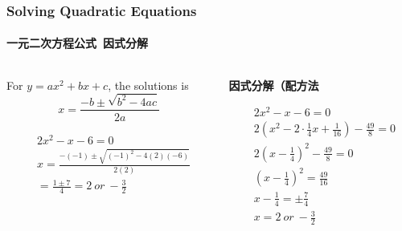 \documentclass[
	11pt, %
]{beamer}
\begin{document}
\begin{frame}
	\frametitle{Solving Quadratic Equations}
	\framesubtitle{一元二次方程公式\ 因式分解}

	\begin{columns}[t] 
		\begin{column}{0.5\textwidth} %
				\begin{theorem}[一元二次方程公式]
					For $y = ax^2 + bx + c$, the solutions is \\
					\begin{equation*}
						x=\frac{-b \pm \sqrt{b^2 - 4ac}}{2a}
					\end{equation*}
				\end{theorem}

				\begin{example}
					\begin{equation*}
						\begin{aligned}
							&2x^2 -x - 6 = 0 \\
							&x = \frac{-(-1) \pm \sqrt{(-1)^2 - 4(2)(-6)}}{2(2)} \\
							&= \frac{1 \pm 7}{4} = 2\ or\ -\frac{3}{2} 
						\end{aligned}
					\end{equation*}
				\end{example}
		\end{column}
		\begin{column}{0.5\textwidth} %
				\textbf{因式分解（配方法}

				\begin{example}
					\begin{equation*}
						\begin{aligned}
							&2x^2 -x - 6 = 0 \\
							&2(x^2 - 2 \cdot \frac{1}{4}x +  \frac{1}{16})-\frac{49}{8} = 0 \\
							&2(x - \frac{1}{4})^2-\frac{49}{8} = 0 \\
							&(x - \frac{1}{4})^2=\frac{49}{16} \\
							& x - \frac{1}{4}=\pm \frac{7}{4} \\
							&x = 2 \ or \ -\frac{3}{2}
						\end{aligned}
					\end{equation*}
				\end{example}
    \end{column}
	\end{columns}
\end{frame}
\end{document}
